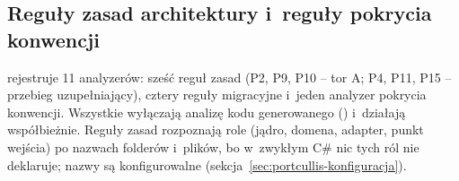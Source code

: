 \subsection{Reguły zasad architektury i~reguły pokrycia konwencji}\label{sec:portcullis-reguly}

 rejestruje 11 analyzerów: sześć reguł zasad (P2, P9, P10 --
tor A; P4, P11, P15 -- przebieg uzupełniający), cztery reguły migracyjne i~jeden analyzer
pokrycia konwencji. Wszystkie wyłączają analizę kodu generowanego
() i~działają współbieżnie. Reguły zasad
rozpoznają role (jądro, domena, adapter, punkt wejścia) po nazwach folderów i~plików, bo
w~zwykłym C\# nic tych ról nie deklaruje; nazwy są konfigurowalne
(sekcja~\ref{sec:portcullis-konfiguracja}).

\begingroup\small
